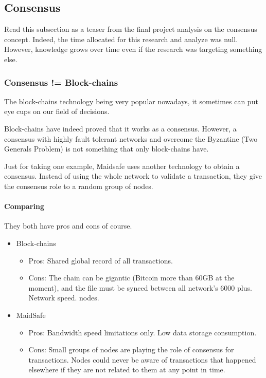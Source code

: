 
\subsection{Consensus}
Read this subsection as a teaser from the final project analysis on the consensus concept. Indeed, the time allocated for this research and analyze was null. However, knowledge grows over time even if the research was targeting something else.

\subsubsection{Consensus != Block-chains}
The block-chains technology being very popular nowadays, it sometimes can put eye cups on our field of decisions.

Block-chains have indeed proved that it works as a consensus. However, a consensus with highly fault tolerant networks and overcome the Byzantine (Two Generals Problem) is not something that only block-chains have.

Just for taking one example, Maidsafe\cite{MaidSafe2014MaidSafe.netCommunity} uses another technology to obtain a consensus\cite{Nick2015CONSENSUSBLOCKCHAIN}. Instead of using the whole network to validate a transaction, they give the consensus role to a random group of nodes.

\paragraph{Comparing} They both have pros and cons of course.
\begin{itemize}
\item Block-chains
\begin{itemize}
\item Pros: Shared global record of all transactions.
\item Cons: The chain can be gigantic (Bitcoin more than 60GB at the moment), and the file must be synced between all network’s 6000 plus. Network speed. nodes\cite{AyeowchGLOBALDISTRIBUTION}.
\end{itemize}
\end{itemize}
\begin{itemize}
\item MaidSafe
\begin{itemize}
\item Pros: Bandwidth speed limitations only. Low data storage consumption.
\item Cons: Small groups of nodes are playing the role of consensus for transactions. Nodes could never be aware of transactions that happened elsewhere if they are not related to them at any point in time.
\end{itemize}
\end{itemize}

